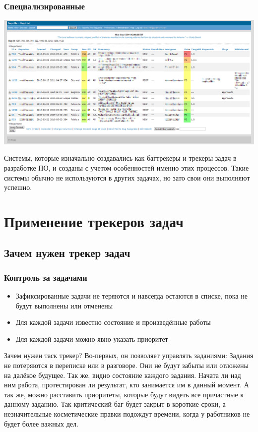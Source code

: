 \documentclass{../industrial-development}
\begin{document}
\begin{frame} \frametitle{Специализированные}
	\centerline{\includegraphics[width=\textwidth]{bugzilla.png}}
\end{frame}

\lecturenotes
Системы, которые изначально создавались как багтрекеры и трекеры задач в разработке ПО, и созданы с учетом особенностей именно этих процессов. Такие системы обычно не используются в других задачах, но зато свои они выполняют успешно.

\section{Применение трекеров задач}

\subsection{Зачем нужен трекер задач}

\begin{frame} \frametitle{Контроль за задачами}
	\begin{itemize}
		\item Зафиксированные задачи не теряются и навсегда остаются в списке, пока не будут выполнены или отменены
		\item Для каждой задачи известно состояние и произведённые работы
		\item Для каждой задачи можно явно указать приоритет
	\end{itemize}
\end{frame}

\lecturenotes
Зачем нужен таск трекер?
Во-первых, он позволяет управлять заданиями: 
Задания не потеряются в переписке или в разговоре. Они не будут забыты или отложены на далёкое будущее.
Так же, видно состояние каждого задания. Начата ли над ним работа, протестирован ли результат, кто занимается им в данный момент.
А так же, можно расставить приоритеты, которые будут видеть все причастные к данному заданию. Так критический баг будет закрыт в короткие сроки, а незначительные косметические правки подождут времени, когда у работников не будет более важных дел.
\end{document}
